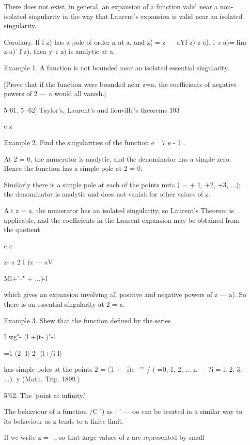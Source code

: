 {{{{There does not exist, in general, an expansion of a function valid
near a non-isolated singularity in the way that Laurent's expansion is
valid near an isolated singularity.

Corollary. If f z) has a pole of order n at a, and z) = z — aYf z) z
a), i\ r a)= lim z-a)' f z), then y\ r z) is analytic at a.

Example 1. A function is not bounded near an isolated essential
singularity.

[Prove that if the function were bounded near z=a, the coefficients of
negative powers of 2 — a would all vanish.]



5-61, 5 -62] Taylor's, Laurent's and liouville's theorems 103

c z\

Example 2. Find the singularities of the function e ~ 7 e - 1 .

At 2 = 0, the numerator is analytic, and the denominator has a simple
zero. Hence the function has a simple pole at 2 = 0.

Similarly there is a simple pole at each of the points mria ( = + 1,
+2, +3, ...); the denominator is analytic and does not vanish for
other values of z.

A.t z = a, the numerator has an isolated singularity, so Laurent's
Theorem is applicable, and the coefficients in the Laurent expansion
may be obtained from the quotient

c c

z- a 2 I (z — aV



Ml+'--" + ...)-l



which gives an expansion involving all positive and negative powers of
z — a). So there is an essential singularity at 2 = a.

Example 3. Shew that the function defined by the series

I wg"- (l +)t- )"-l

 =1 (2 -l) 2 -(l+/i-l)

has simple poles at the points 2 = (1 + ~i)e- ''' / ( =0, 1, 2, ... n
— \; ?i = l, 2, 3, ...). y (Math. Trip. 1899.)

5'62. The 'point at infinity.'

The behaviour of a function /C ') as | ' — oo can be treated in a
similar way to its behaviour as z tends to a finite limit.

If we write z = -,, so that large values of z are represented by small

}}}}
